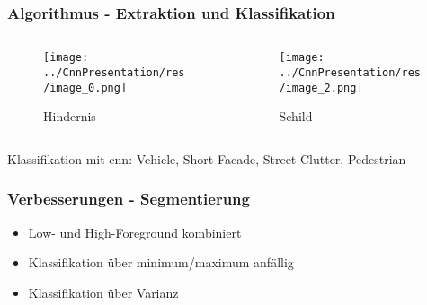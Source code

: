 \begin{frame}
    \frametitle{Algorithmus - Extraktion und Klassifikation}
    \begin{columns}
        \begin{column}{.5\textwidth}
            \begin{figure}
                \centering
                \texttt{[image: ../CnnPresentation/res/image\_0.png]}
                \caption{Hindernis}
            \end{figure}
        \end{column}
        \begin{column}{.5\textwidth}
            \begin{figure}
                \centering
                \texttt{[image: ../CnnPresentation/res/image\_2.png]}
                \caption{Schild}
            \end{figure}
        \end{column}
    \end{columns}
    \pause
    Klassifikation mit \ac{cnn}: Vehicle, Short Facade, Street Clutter, Pedestrian
\end{frame}

\begin{frame}
    \frametitle{Verbesserungen - Segmentierung}
    \begin{itemize}
        \item Low- und High-Foreground kombiniert
            \pause
        \item Klassifikation über minimum/maximum anfällig
            \pause
        \item Klassifikation über Varianz
    \end{itemize}
\end{frame}

